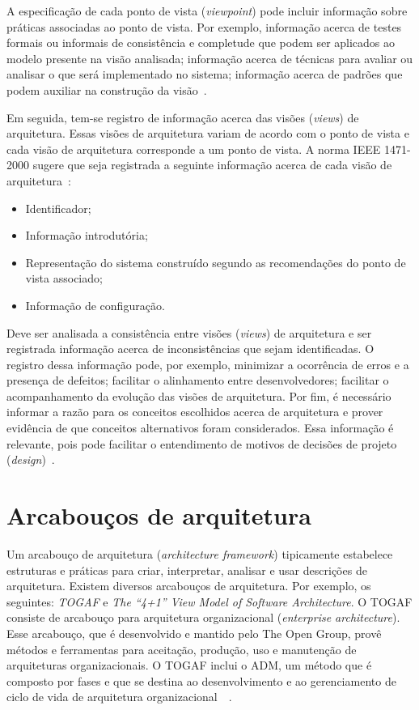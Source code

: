 A especificação de cada ponto de vista (\emph{viewpoint}) pode incluir informação sobre  práticas associadas ao ponto de vista. Por exemplo, informação acerca de testes formais ou informais de consistência e completude que podem ser aplicados ao modelo presente na visão analisada; informação acerca de técnicas para avaliar ou analisar o que será implementado no sistema; informação acerca de padrões que podem auxiliar na construção da visão~\cite{ISO_1471}. 

Em seguida, tem-se registro de informação acerca das visões (\emph{views}) de arquitetura. Essas visões de arquitetura variam de acordo com o ponto de vista e cada visão de arquitetura corresponde a um ponto de vista. A norma IEEE 1471-2000 sugere que seja registrada a seguinte informação acerca de cada visão de arquitetura~\cite{ISO_1471}:

\begin{itemize}
    \item Identificador;
    \item Informação introdutória;
    \item Representação do sistema construído segundo as recomendações do ponto de vista associado;
    \item Informação de configuração.
\end{itemize}

Deve ser analisada a consistência entre visões (\emph{views}) de arquitetura e ser registrada informação acerca de inconsistências que sejam identificadas. O registro dessa informação pode, por exemplo, minimizar a ocorrência de erros e a presença de defeitos; facilitar o alinhamento entre desenvolvedores; facilitar o acompanhamento da evolução das visões de arquitetura. Por fim, é necessário informar a razão para os conceitos escolhidos acerca de arquitetura e prover evidência de que conceitos alternativos foram considerados. Essa informação é relevante, pois pode facilitar o entendimento de motivos de decisões de projeto (\emph{design})~\cite{ISO_1471}.

\section{Arcabouços de arquitetura}

Um arcabouço de arquitetura (\emph{architecture framework}) tipicamente estabelece estruturas e práticas para criar, interpretar, analisar e usar descrições de arquitetura. Existem diversos arcabouços de arquitetura. Por exemplo, os seguintes: \emph{\acrfull{TOGAF}} e \emph{The “4+1” View Model of Software Architecture}. O TOGAF consiste de arcabouço para arquitetura organizacional (\emph{enterprise architecture}). Esse arcabouço, que é desenvolvido e mantido pelo The Open Group, provê métodos e ferramentas para aceitação, produção, uso e manutenção de arquiteturas organizacionais. O TOGAF inclui o \acrfull{ADM}, um método que é composto por fases e que se destina ao desenvolvimento e ao gerenciamento de ciclo de vida de arquitetura organizacional~\cite{ISO_42010}~\cite{Togaf}. 

